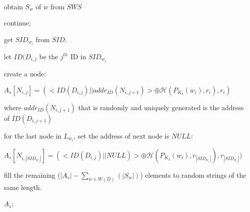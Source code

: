 \begin{algorithm}[!htb]
\caption{ $SSBuildArray$ }
\label{alg:SSBuildArray}
\begin{algorithmic} [1]

\ENSURE ~~\\


  \STATE obtain $S_w$ of $w$ from $SWS$

    \STATE continue;
  \ENDIF


    \STATE get {$ SID_{w_i} $} from $SID$.



      \STATE let $ID(D_{i,j}$ be the $j^{th}$ ID in $SID_{w_i}$

      \STATE create a node: ~~\\
      \begin{center}
      $A_s[N_{i,j}] = (<ID(D_{i,j}) || addr_{ID}(N_{i,j+1})>\oplus \mathcal{H}(P_{K_3}(w_i),r_i), r_i)$
      \end{center}
      where $addr_{ID}(N_{i,j+1})$ that is randomly and uniquely generated is the address of $ID(D_{i,j+1})$

      \STATE for the last node in $L_{w_i}$, set the address of next node is $NULL$:
      \begin{center}
      $A_s[N_{i,|SID_{w_i}|}]=(<ID(D_{i,j}) || NULL)>\oplus \mathcal{H}(P_{K_3}(w_i),r_{|SID_{w_i}|}), r_{|SID_{w_i}|})$
      \end{center}

    \ENDWHILE

    \STATE fill the remaining ($|A_s| - \sum_{w \in W(D)}(|S_w|) $) elements to random strings of the same length.

  \ENDWHILE

\ENDWHILE

\RETURN ${A_s}$;

\end{algorithmic}
\end{algorithm}


